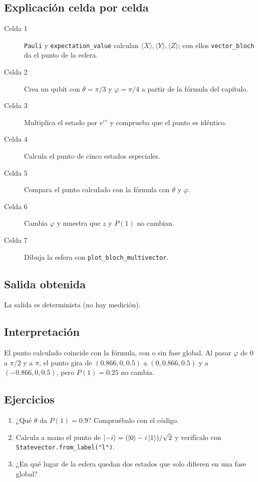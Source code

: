 \subsection{Explicación celda por celda}
\begin{description}
  \item[Celda 1] \texttt{Pauli} y \texttt{expectation\_value} calculan
    $\langle X\rangle,\langle Y\rangle,\langle Z\rangle$; con ellos
    \texttt{vector\_bloch} da el punto de la esfera.
  \item[Celda 2] Crea un qubit con $\theta=\pi/3$ y $\varphi=\pi/4$ a partir de
    la fórmula del capítulo.
  \item[Celda 3] Multiplica el estado por $e^{i\gamma}$ y comprueba que el
    punto es idéntico.
  \item[Celda 4] Calcula el punto de cinco estados especiales.
  \item[Celda 5] Compara el punto calculado con la fórmula con $\theta$ y
    $\varphi$.
  \item[Celda 6] Cambia $\varphi$ y muestra que $z$ y $P(1)$ no cambian.
  \item[Celda 7] Dibuja la esfera con \texttt{plot\_bloch\_multivector}.
\end{description}

\subsection{Salida obtenida}

La salida es determinista (no hay medición).

\subsection{Interpretación}
El punto calculado coincide con la fórmula, con o sin fase global. Al pasar
$\varphi$ de $0$ a $\pi/2$ y a $\pi$, el punto gira de $(0.866,0,0.5)$ a
$(0,0.866,0.5)$ y a $(-0.866,0,0.5)$, pero $P(1)=0.25$ no cambia.

\subsection{Ejercicios}
\begin{enumerate}
  \item ¿Qué $\theta$ da $P(1)=0.9$? Compruébalo con el código.
  \item Calcula a mano el punto de $\left|-i\right\rangle=(\left|0\right\rangle-i\left|1\right\rangle)/\sqrt2$ y
    verifícalo con \texttt{Statevector.from\_label("l")}.
  \item ¿En qué lugar de la esfera quedan dos estados que solo difieren en una
    fase global?
\end{enumerate}


